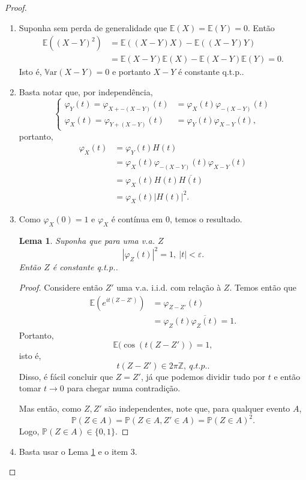 \documentclass[12pt,a4paper,oneside]{book}
\newtheorem{lemma}[theorem]{Lema}
\theoremstyle{definition}
\theoremstyle{remark}
\numberwithin{equation}{section}
\newcommand{\e}{\varepsilon}
\newcommand{\E}{\mathbb{E}}
\newcommand{\pr}{\mathbb{P}}
\newcommand{\Var}{\mathbb{V}\text{ar}}
\begin{document}
\begin{proof}
\begin{enumerate}
\item Suponha sem perda de generalidade que $\E(X)=\E(Y)=0$. Então
\begin{align*}
\E((X-Y)^2) &= \E((X-Y)X) - \E((X-Y)Y)\\
& = \E(X-Y)\E(X) - \E(X-Y)\E(Y)=0.
\end{align*}
Isto é, $\Var(X-Y)=0$ e portanto $X-Y$ é constante q.t.p..

\item Basta notar que, por independência,
$$
\begin{cases}
\varphi_Y(t) = \varphi_{X + -(X-Y)}(t) &= \varphi_X(t)\varphi_{-(X-Y)}(t)\\
\varphi_X(t) = \varphi_{Y+(X-Y)}(t) &= \varphi_Y(t)\varphi_{X-Y}(t),
\end{cases}
$$
portanto,
\begin{align*}
\varphi_X(t) &= \varphi_Y(t) H(t)\\
& = \varphi_X(t)\varphi_{-(X-Y)}(t)\varphi_{X-Y}(t)\\
& = \varphi_X(t)H(t)\overline{H(t)}\\
& = \varphi_X(t)|H(t)|^2.
\end{align*}

\item Como $\varphi_X(0)=1$ e $\varphi_X$ é contínua em 0, temos o resultado.

\begin{tcolorbox}

\begin{lemma}\label{lema- funcao caracteristaica costant em torno da origem}
Suponha que para uma v.a. $Z$
$$ |\varphi_Z(t)|^2 = 1,\ |t|<\e. $$
Então $Z$ é constante q.t.p..
\end{lemma}
\end{tcolorbox} 
\begin{proof}
Considere então $Z'$ uma v.a. i.i.d. com relação à $Z$. Temos então que
\begin{align*}
\E(e^{it(Z-Z')}) &= \varphi_{Z-Z'}(t)\\ 
&= \varphi_{Z}(t)\overline{\varphi_{Z}(t)} =  1.
\end{align*}
Portanto, 
$$\E(\cos(t(Z-Z')) = 1, $$
isto é,
$$t(Z-Z') \in 2\pi\mathbb{Z},\ q.t.p..$$
Disso, é fácil concluir que $Z=Z'$, já que podemos dividir tudo por $t$ e então tomar $t\rightarrow 0$ para chegar numa contradição.

Mas então, como $Z,Z'$ são independentes, note que, para qualquer evento $A$,
$$\pr(Z\in A) = \pr(Z\in A,Z'\in A) = \pr(Z\in A)^2. $$
Logo, $\pr(Z\in A)\in \{0,1\}.$
\end{proof}

\item Basta usar o Lema \ref{lema- funcao caracteristaica costant em torno da origem} e o item 3.

\end{enumerate}
\end{proof}
\end{document}
